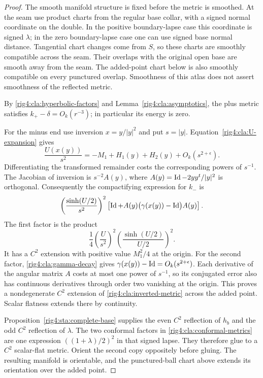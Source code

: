 \begin{proof}
The smooth manifold structure is fixed before the metric is smoothed.
At the seam use product charts from the regular base collar, with a
signed normal coordinate on the double.  In the positive boundary-lapse
case this coordinate is signed $\lambda$; in the zero boundary-lapse
case one can use signed base normal distance.  Tangential chart changes
come from $S$, so these charts are smoothly compatible across the seam.
Their overlaps with the original open base are smooth away from the
seam.  The added-point chart below is also smoothly compatible on every
punctured overlap.  Smoothness of this atlas does not assert smoothness
of the reflected metric.

By \eqref{rig4:cla:hyperbolic-factors} and
Lemma~\ref{rig4:cla:asymptotics}, the plus metric satisfies
$k_+-\delta=O_k(r^{-3})$; in particular its energy is zero.

For the minus end use inversion $x=y/|y|^2$ and put $s=|y|$.
Equation~\eqref{rig4:cla:U-expansion} gives
\begin{equation}\label{rig4:cla:inverted-lapse}
 \frac{U(x(y))}{s^2}
 =-M_1+H_1(y)+H_2(y)+O_k(s^{2+\epsilon}).
\end{equation}
Differentiating the transformed remainder costs the corresponding
powers of $s^{-1}$.  The Jacobian of inversion is $s^{-2}A(y)$,
where $A(y)=\operatorname{Id}-2yy^t/|y|^2$ is orthogonal.  Consequently the
compactifying expression for $k_-$ is
\begin{equation}\label{rig4:cla:inverted-metric}
 \left(\frac{\sinh(U/2)}{s^2}\right)^2
 \left[\operatorname{Id}+A(y)\bigl(\gamma(x(y))-\operatorname{Id}\bigr)A(y)\right].
\end{equation}
The first factor is the product
\[
 \frac14\left(\frac{U}{s^2}\right)^2
       \left(\frac{\sinh(U/2)}{U/2}\right)^2.
\]
It has a $C^2$ extension with positive value $M_1^2/4$ at the origin.
For the second factor, \eqref{rig4:cla:gamma-decay} gives
$\gamma(x(y))-\operatorname{Id}=O_k(s^{2+\epsilon})$.
Each derivative of the angular matrix $A$ costs at most one power
of $s^{-1}$, so its conjugated error also has continuous derivatives
through order two vanishing at the origin.  This proves a
nondegenerate $C^2$ extension of \eqref{rig4:cla:inverted-metric} across
the added point.  Scalar flatness extends there by continuity.

Proposition~\ref{rig4:sta:complete-base} supplies the
even $C^2$ reflection of $h_b$ and the odd $C^2$ reflection of
$\lambda$.  The two conformal factors in
\eqref{rig4:cla:conformal-metrics} are one expression
$((1+\lambda)/2)^2$ in that signed lapse.  They therefore glue to a
$C^2$ scalar-flat metric.  Orient the second copy oppositely before
gluing.  The resulting manifold is orientable, and the punctured-ball
chart above extends its orientation over the added point.


\end{proof}
